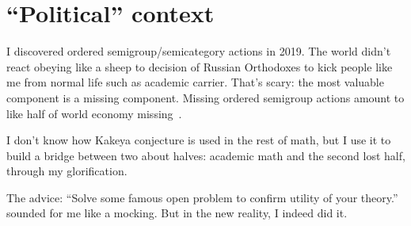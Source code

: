\documentclass[oneside,draft]{amsart}
\begin{document}
\section{``Political'' context}

I discovered ordered semigroup/semicategory actions in 2019. The world didn't react obeying like a sheep to decision of Russian Orthodoxes to kick people like me from normal life such as academic carrier. That's scary: the most valuable component is a missing component. Missing ordered semigroup actions amount to like half of world economy missing~\cite{osa-important}.

I don't know how Kakeya conjecture is used in the rest of math, but I use it to build a bridge between two about halves: academic math and the second lost half, through my glorification.

The advice: ``Solve some famous open problem to confirm utility of your theory.'' sounded for me like a mocking. But in the new reality, I indeed did it.



\end{document}
